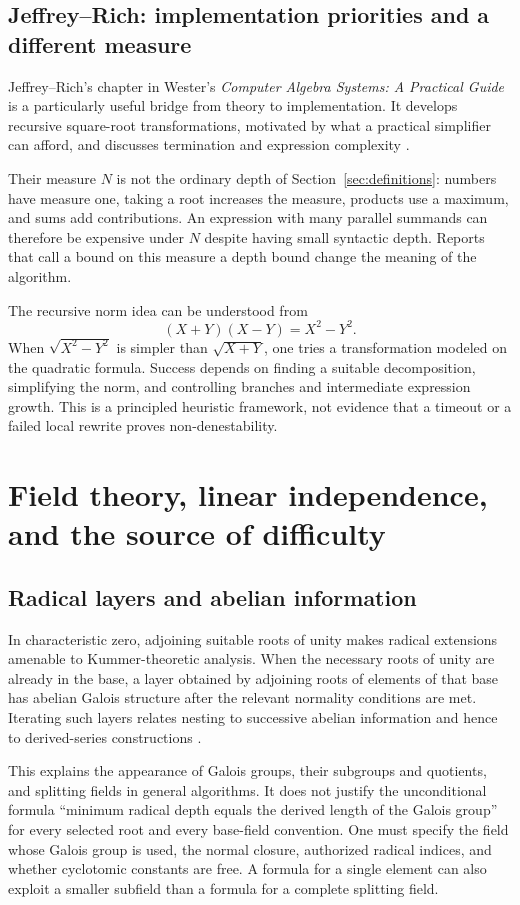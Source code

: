 \documentclass[11pt,letterpaper]{article}
\numberwithin{equation}{section}
\theoremstyle{definition}
\theoremstyle{remark}
\begin{document}
\subsection{Jeffrey--Rich: implementation priorities and a different measure}
Jeffrey--Rich's chapter in Wester's \emph{Computer Algebra Systems: A Practical Guide} is a particularly useful bridge from theory to implementation. It develops recursive square-root transformations, motivated by what a practical simplifier can afford, and discusses termination and expression complexity \cite{jeffrey}.

Their measure $N$ is not the ordinary depth of Section~\ref{sec:definitions}: numbers have measure one, taking a root increases the measure, products use a maximum, and sums add contributions. An expression with many parallel summands can therefore be expensive under $N$ despite having small syntactic depth. Reports that call a bound on this measure a depth bound change the meaning of the algorithm.

The recursive norm idea can be understood from
\[
(X+Y)(X-Y)=X^2-Y^2.
\]
When $\sqrt{X^2-Y^2}$ is simpler than $\sqrt{X+Y}$, one tries a transformation modeled on the quadratic formula. Success depends on finding a suitable decomposition, simplifying the norm, and controlling branches and intermediate expression growth. This is a principled heuristic framework, not evidence that a timeout or a failed local rewrite proves non-denestability.

\section{Field theory, linear independence, and the source of difficulty}\label{sec:fields}

\subsection{Radical layers and abelian information}
In characteristic zero, adjoining suitable roots of unity makes radical extensions amenable to Kummer-theoretic analysis. When the necessary roots of unity are already in the base, a layer obtained by adjoining roots of elements of that base has abelian Galois structure after the relevant normality conditions are met. Iterating such layers relates nesting to successive abelian information and hence to derived-series constructions \cite{landau,hornghuang,honsbeek}.

This explains the appearance of Galois groups, their subgroups and quotients, and splitting fields in general algorithms. It does not justify the unconditional formula ``minimum radical depth equals the derived length of the Galois group'' for every selected root and every base-field convention. One must specify the field whose Galois group is used, the normal closure, authorized radical indices, and whether cyclotomic constants are free. A formula for a single element can also exploit a smaller subfield than a formula for a complete splitting field.
\end{document}
